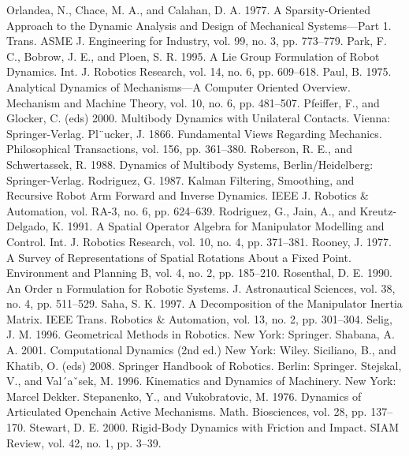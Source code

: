Orlandea, N., Chace, M. A., and Calahan, D. A. 1977. A Sparsity-Oriented Approach to the Dynamic Analysis and Design of Mechanical Systems—Part 1. Trans. ASME J. Engineering for Industry, vol. 99, no. 3, pp. 773–779. Park, F. C., Bobrow, J. E., and Ploen, S. R. 1995. A Lie Group Formulation of Robot Dynamics. Int. J. Robotics Research, vol. 14, no. 6, pp. 609–618. Paul, B. 1975. Analytical Dynamics of Mechanisms—A Computer Oriented Overview. Mechanism and Machine Theory, vol. 10, no. 6, pp. 481–507. Pfeiffer, F., and Glocker, C. (eds) 2000. Multibody Dynamics with Unilateral Contacts. Vienna: Springer-Verlag. Pl¨ucker, J. 1866. Fundamental Views Regarding Mechanics. Philosophical Transactions, vol. 156, pp. 361–380. Roberson, R. E., and Schwertassek, R. 1988. Dynamics of Multibody Systems, Berlin/Heidelberg: Springer-Verlag. Rodriguez, G. 1987. Kalman Filtering, Smoothing, and Recursive Robot Arm Forward and Inverse Dynamics. IEEE J. Robotics \& Automation, vol. RA-3, no. 6, pp. 624–639. Rodriguez, G., Jain, A., and Kreutz-Delgado, K. 1991. A Spatial Operator Algebra for Manipulator Modelling and Control. Int. J. Robotics Research, vol. 10, no. 4, pp. 371–381. Rooney, J. 1977. A Survey of Representations of Spatial Rotations About a Fixed Point. Environment and Planning B, vol. 4, no. 2, pp. 185–210. Rosenthal, D. E. 1990. An Order n Formulation for Robotic Systems. J. Astronautical Sciences, vol. 38, no. 4, pp. 511–529. Saha, S. K. 1997. A Decomposition of the Manipulator Inertia Matrix. IEEE Trans. Robotics \& Automation, vol. 13, no. 2, pp. 301–304. Selig, J. M. 1996. Geometrical Methods in Robotics. New York: Springer. Shabana, A. A. 2001. Computational Dynamics (2nd ed.) New York: Wiley. Siciliano, B., and Khatib, O. (eds) 2008. Springer Handbook of Robotics. Berlin: Springer. Stejskal, V., and Val´aˇsek, M. 1996. Kinematics and Dynamics of Machinery. New York: Marcel Dekker. Stepanenko, Y., and Vukobratovic, M. 1976. Dynamics of Articulated Openchain Active Mechanisms. Math. Biosciences, vol. 28, pp. 137–170. Stewart, D. E. 2000. Rigid-Body Dynamics with Friction and Impact. SIAM Review, vol. 42, no. 1, pp. 3–39.

